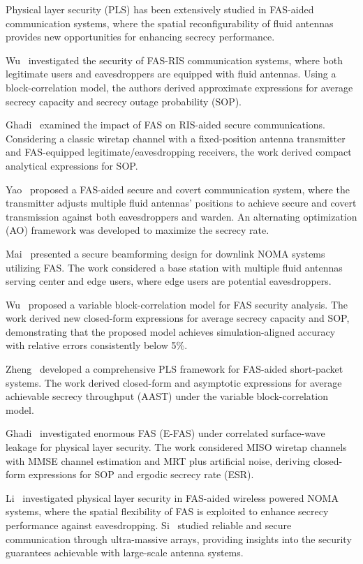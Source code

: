 Physical layer security (PLS) has been extensively studied in FAS-aided communication systems, where the spatial reconfigurability of fluid antennas provides new opportunities for enhancing secrecy performance.

Wu~\cite{wu2024fasris} investigated the security of FAS-RIS communication systems, where both legitimate users and eavesdroppers are equipped with fluid antennas. Using a block-correlation model, the authors derived approximate expressions for average secrecy capacity and secrecy outage probability (SOP).

Ghadi~\cite{ghadi2024ris} examined the impact of FAS on RIS-aided secure communications. Considering a classic wiretap channel with a fixed-position antenna transmitter and FAS-equipped legitimate/eavesdropping receivers, the work derived compact analytical expressions for SOP.

Yao~\cite{yao2024fas} proposed a FAS-aided secure and covert communication system, where the transmitter adjusts multiple fluid antennas' positions to achieve secure and covert transmission against both eavesdroppers and warden. An alternating optimization (AO) framework was developed to maximize the secrecy rate.

Mai~\cite{mai2024noma} presented a secure beamforming design for downlink NOMA systems utilizing FAS. The work considered a base station with multiple fluid antennas serving center and edge users, where edge users are potential eavesdroppers.

Wu~\cite{wu2025variable} proposed a variable block-correlation model for FAS security analysis. The work derived new closed-form expressions for average secrecy capacity and SOP, demonstrating that the proposed model achieves simulation-aligned accuracy with relative errors consistently below 5\%.

Zheng~\cite{zheng2026pls} developed a comprehensive PLS framework for FAS-aided short-packet systems. The work derived closed-form and asymptotic expressions for average achievable secrecy throughput (AAST) under the variable block-correlation model.

Ghadi~\cite{ghadi2026efas} investigated enormous FAS (E-FAS) under correlated surface-wave leakage for physical layer security. The work considered MISO wiretap channels with MMSE channel estimation and MRT plus artificial noise, deriving closed-form expressions for SOP and ergodic secrecy rate (ESR).

Li~\cite{li2025fas} investigated physical layer security in FAS-aided wireless powered NOMA systems, where the spatial flexibility of FAS is exploited to enhance secrecy performance against eavesdropping. Si~\cite{si2024reliable} studied reliable and secure communication through ultra-massive arrays, providing insights into the security guarantees achievable with large-scale antenna systems.

